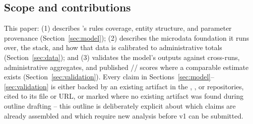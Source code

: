 \subsection{Scope and contributions}
\label{sec:scope}

This paper: (1) describes \policyengineus{}'s rules coverage, entity
structure, and parameter provenance (Section~\ref{sec:model}); (2) describes
the microdata foundation it runs over, the \microcosm{} stack, and how that
data is calibrated to administrative totals (Section~\ref{sec:data}); and
(3) validates the model's outputs against \taxsim{} cross-runs,
administrative aggregates, and published \cbo{}/\jct{}/\tpc{} scores where a
comparable estimate exists (Section~\ref{sec:validation}). Every claim in
Sections~\ref{sec:model}--\ref{sec:validation} is either backed by an
existing artifact in the \policyengineus{}, \microcosm{}, or \policybench{}
repositories, cited to its file or URL, or marked
 where no existing artifact was found during outline
drafting -- this outline is deliberately explicit about which claims are
already assembled and which require new analysis before v1 can be
submitted.
